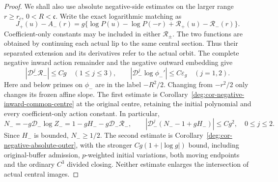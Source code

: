 \begin{proof}
We shall also use absolute negative-side estimates on the larger range
\(r\ge r_c\), \(0<R<\mathfrak c\).  Write the exact logarithmic
matching as
\[
 J_+(u)-A_-(r)
 =g\{\log P(u)-\log P(-r)+\mathcal R_+(u)-\mathcal R_-(r)\}.
\]
Coefficient-only constants may be included in either \(\mathcal R_\pm\).
The two functions are obtained by continuing each actual lip to the same
central section.  Thus their separated extension and its derivatives
refer to the actual orbit.  The complete negative inward action remainder and the negative
outward embedding give
\begin{equation}
 |\mathcal D_-^j\mathcal R_-|\le Cg\quad(1\le j\le3),\qquad
 |\mathcal D_-^j\log\phi_-'|\le C\varepsilon_g\quad(j=1,2).
 \label{deg:quadratic-negative-absolute}
\end{equation}
Here and below primes on \(\phi_-\) are in the label \(-R^2/2\).
Changing from \(-r^2/2\) only changes its frozen affine slope.
The first estimate is Corollary~\ref{deg:cor-negative-inward-common-centre}
at the original centre, retaining the initial polynomial and every
coefficient-only action constant. In particular,
\[
 N_-=-g\mathcal D_-\log Z_-
 =1-gH_--g\mathcal D_-\mathcal R_-,\qquad
 |\mathcal D_-^j(N_--1+gH_-)|\le Cg^2,\quad0\le j\le2.
\]
Since \(H_-\) is bounded, \(N_-\ge1/2\). The second estimate is
Corollary~\ref{deg:cor-negative-absolute-outer}, with the stronger
\(Cg(1+|\log g|)\) bound, including original-buffer admission,
\(p\)-weighted initial variations, both moving endpoints and the
ordinary \(C^3\) divided closing. Neither estimate enlarges the
intersection of actual central images.


\end{proof}
